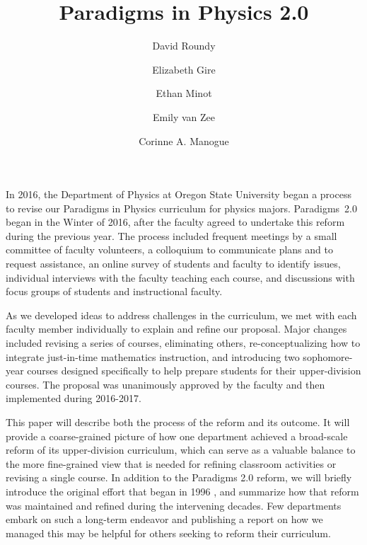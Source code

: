 \documentclass[aps,prstper,reprint]{revtex4-1}
\begin{document}
\title{Paradigms in Physics 2.0}
\author{David Roundy}
\author{Elizabeth Gire}
\author{Ethan Minot}
\author{Emily van Zee}
\author{Corinne A. Manogue}


\maketitle

In 2016, the Department of Physics at Oregon State University began a
process to revise our Paradigms in Physics curriculum for physics
majors. Paradigms~2.0 began in the Winter of 2016, after the faculty agreed to undertake this reform during the previous year. The process included frequent meetings by a small committee of faculty volunteers, a colloquium to communicate plans and to request assistance, an online survey of students and faculty to identify issues, individual interviews with the faculty teaching each course, and discussions with focus groups of students and instructional faculty. 

As we developed ideas to address challenges in the curriculum, we met with each faculty member individually to explain and refine our proposal. Major changes included revising a series of courses, eliminating others, re-conceptualizing how to integrate just-in-time mathematics instruction, and introducing two sophomore-year courses designed specifically to help prepare students for their upper-division courses. The proposal was unanimously approved by the faculty and then implemented during 2016-2017. 

This paper will describe both the process of the reform and its
outcome. It will provide a coarse-grained picture of how one department achieved a broad-scale reform of its upper-division curriculum, which can serve as a valuable balance to the more fine-grained view that is needed for refining classroom activities or revising a single course.  In addition to the Paradigms 2.0 reform, we will briefly introduce the original effort that began in 1996 \cite{manogue2001paradigms,manogue2003paradigms}, and summarize how that reform was maintained and refined during the intervening decades. Few departments embark on such a long-term endeavor and publishing a report on how we managed this may be helpful for others seeking to reform their curriculum.
\end{document}
